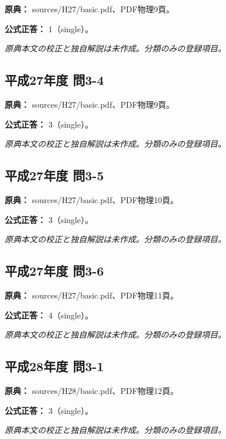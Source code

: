 \noindent\textbf{原典：} sources/H27/basic.pdf、PDF物理9頁。

\textbf{公式正答：} 1（single）。

\par\textit{原典本文の校正と独自解説は未作成。分類のみの登録項目。}

\subsection{平成27年度 問3-4}
\label{q:h27-reg-basic-3-4}

\noindent\textbf{原典：} sources/H27/basic.pdf、PDF物理9頁。

\textbf{公式正答：} 3（single）。

\par\textit{原典本文の校正と独自解説は未作成。分類のみの登録項目。}

\subsection{平成27年度 問3-5}
\label{q:h27-reg-basic-3-5}

\noindent\textbf{原典：} sources/H27/basic.pdf、PDF物理10頁。

\textbf{公式正答：} 3（single）。

\par\textit{原典本文の校正と独自解説は未作成。分類のみの登録項目。}

\subsection{平成27年度 問3-6}
\label{q:h27-reg-basic-3-6}

\noindent\textbf{原典：} sources/H27/basic.pdf、PDF物理11頁。

\textbf{公式正答：} 4（single）。

\par\textit{原典本文の校正と独自解説は未作成。分類のみの登録項目。}

\subsection{平成28年度 問3-1}
\label{q:h28-reg-basic-3-1}

\noindent\textbf{原典：} sources/H28/basic.pdf、PDF物理12頁。

\textbf{公式正答：} 3（single）。

\par\textit{原典本文の校正と独自解説は未作成。分類のみの登録項目。}

